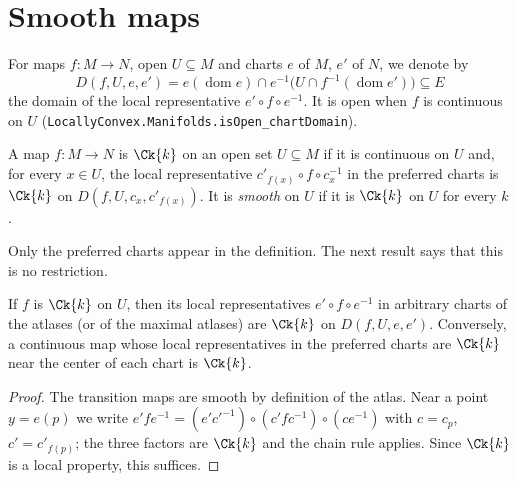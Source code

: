 \section{Smooth maps}

For maps $f \colon M \to N$, open $U \subseteq M$ and charts $e$ of $M$, $e'$ of $N$, we denote
by
\[
  D(f, U, e, e') = e(\operatorname{dom} e) \cap e^{-1}\bigl(U \cap f^{-1}(\operatorname{dom}
  e')\bigr) \subseteq E
\]
the domain of the local representative $e' \circ f \circ e^{-1}$. It is open when $f$ is
continuous on $U$ (\texttt{LocallyConvex.Manifolds.isOpen\_chartDomain}).

\begin{definition}
  \label{def:contmdiff}
  \leanok
  A map $f \colon M \to N$ is $\Ck{k}$ on an open set $U \subseteq M$ if it is continuous on $U$
  and, for every $x \in U$, the local representative $c'_{f(x)} \circ f \circ c_x^{-1}$ in the
  preferred charts is $\Ck{k}$ on $D(f, U, c_x, c'_{f(x)})$. It is \emph{smooth} on $U$ if it is
  $\Ck{k}$ on $U$ for every $k$.
\end{definition}

Only the preferred charts appear in the definition. The next result says that this is no
restriction.

\begin{theorem}
  \label{thm:man-contmdiff-chart}
  \leanok
  If $f$ is $\Ck{k}$ on $U$, then its local representatives $e' \circ f \circ e^{-1}$ in arbitrary
  charts of the atlases (or of the maximal atlases) are $\Ck{k}$ on $D(f, U, e, e')$.
  Conversely, a continuous map whose local representatives in the preferred charts are
  $\Ck{k}$ near the center of each chart is $\Ck{k}$.
\end{theorem}

\begin{proof}
  \leanok
  The transition maps are smooth by definition of the atlas. Near a point $y = e(p)$ we write
  $e' f e^{-1} = (e' c'^{-1}) \circ (c' f c^{-1}) \circ (c e^{-1})$ with $c = c_p$,
  $c' = c'_{f(p)}$; the three factors are $\Ck{k}$ and the chain rule applies. Since $\Ck{k}$ is a
  local property, this suffices.
\end{proof}

